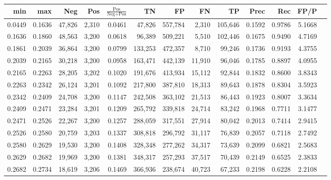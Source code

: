 \begin{tabular}{rrrrrrrrrrrrr}
\toprule
   min &    max &    Neg &   Pos & $\frac{\text{Pos}}{\text{Neg}+\text{Pos}}$ &      TN &      FP &      FN &      TP &   Prec &    Rec &   FP/P \\
\midrule
0.0449 & 0.1636 & 47,826 & 2,310 &                                     0.0461 &  47,826 & 557,784 &   2,310 & 105,646 & 0.1592 & 0.9786 & 5.1668 \\
0.1636 & 0.1860 & 48,563 & 3,200 &                                     0.0618 &  96,389 & 509,221 &   5,510 & 102,446 & 0.1675 & 0.9490 & 4.7169 \\
0.1861 & 0.2039 & 36,864 & 3,200 &                                     0.0799 & 133,253 & 472,357 &   8,710 &  99,246 & 0.1736 & 0.9193 & 4.3755 \\
0.2039 & 0.2165 & 30,218 & 3,200 &                                     0.0958 & 163,471 & 442,139 &  11,910 &  96,046 & 0.1785 & 0.8897 & 4.0955 \\
0.2165 & 0.2263 & 28,205 & 3,202 &                                     0.1020 & 191,676 & 413,934 &  15,112 &  92,844 & 0.1832 & 0.8600 & 3.8343 \\
0.2263 & 0.2342 & 26,124 & 3,201 &                                     0.1092 & 217,800 & 387,810 &  18,313 &  89,643 & 0.1878 & 0.8304 & 3.5923 \\
0.2342 & 0.2409 & 24,708 & 3,200 &                                     0.1147 & 242,508 & 363,102 &  21,513 &  86,443 & 0.1923 & 0.8007 & 3.3634 \\
0.2409 & 0.2471 & 23,284 & 3,201 &                                     0.1209 & 265,792 & 339,818 &  24,714 &  83,242 & 0.1968 & 0.7711 & 3.1477 \\
0.2471 & 0.2526 & 22,267 & 3,200 &                                     0.1257 & 288,059 & 317,551 &  27,914 &  80,042 & 0.2013 & 0.7414 & 2.9415 \\
0.2526 & 0.2580 & 20,759 & 3,203 &                                     0.1337 & 308,818 & 296,792 &  31,117 &  76,839 & 0.2057 & 0.7118 & 2.7492 \\
0.2580 & 0.2629 & 19,530 & 3,200 &                                     0.1408 & 328,348 & 277,262 &  34,317 &  73,639 & 0.2099 & 0.6821 & 2.5683 \\
0.2629 & 0.2682 & 19,969 & 3,200 &                                     0.1381 & 348,317 & 257,293 &  37,517 &  70,439 & 0.2149 & 0.6525 & 2.3833 \\
0.2682 & 0.2734 & 18,619 & 3,206 &                                     0.1469 & 366,936 & 238,674 &  40,723 &  67,233 & 0.2198 & 0.6228 & 2.2108 \\

\end{tabular}
